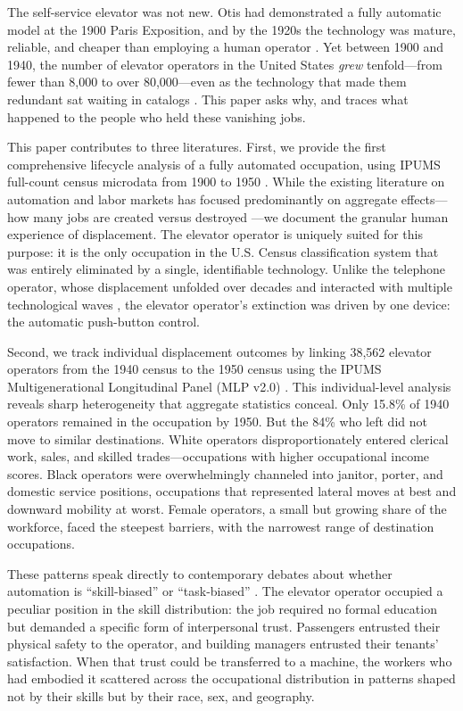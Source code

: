 \documentclass[12pt]{article}
\begin{document}
The self-service elevator was not new. Otis had demonstrated a fully automatic model at the 1900 Paris Exposition, and by the 1920s the technology was mature, reliable, and cheaper than employing a human operator \citep{goodwin2005}. Yet between 1900 and 1940, the number of elevator operators in the United States \emph{grew} tenfold---from fewer than 8,000 to over 80,000---even as the technology that made them redundant sat waiting in catalogs \citep{bernard2014}. This paper asks why, and traces what happened to the people who held these vanishing jobs.

This paper contributes to three literatures. First, we provide the first comprehensive lifecycle analysis of a fully automated occupation, using IPUMS full-count census microdata from 1900 to 1950 \citep{ruggles2024}. While the existing literature on automation and labor markets has focused predominantly on aggregate effects---how many jobs are created versus destroyed \citep{acemoglu2020, autor2003, frey2017}---we document the granular human experience of displacement. The elevator operator is uniquely suited for this purpose: it is the only occupation in the U.S. Census classification system that was entirely eliminated by a single, identifiable technology. Unlike the telephone operator, whose displacement unfolded over decades and interacted with multiple technological waves \citep{feigenbaum2024}, the elevator operator's extinction was driven by one device: the automatic push-button control.

Second, we track individual displacement outcomes by linking 38,562 elevator operators from the 1940 census to the 1950 census using the IPUMS Multigenerational Longitudinal Panel (MLP v2.0) \citep{ruggles2021}. This individual-level analysis reveals sharp heterogeneity that aggregate statistics conceal. Only 15.8\% of 1940 operators remained in the occupation by 1950. But the 84\% who left did not move to similar destinations. White operators disproportionately entered clerical work, sales, and skilled trades---occupations with higher occupational income scores. Black operators were overwhelmingly channeled into janitor, porter, and domestic service positions, occupations that represented lateral moves at best and downward mobility at worst. Female operators, a small but growing share of the workforce, faced the steepest barriers, with the narrowest range of destination occupations.

These patterns speak directly to contemporary debates about whether automation is ``skill-biased'' or ``task-biased'' \citep{goldinkatz2008, autor2003, acemoglu2019}. The elevator operator occupied a peculiar position in the skill distribution: the job required no formal education but demanded a specific form of interpersonal trust. Passengers entrusted their physical safety to the operator, and building managers entrusted their tenants' satisfaction. When that trust could be transferred to a machine, the workers who had embodied it scattered across the occupational distribution in patterns shaped not by their skills but by their race, sex, and geography.
\end{document}
